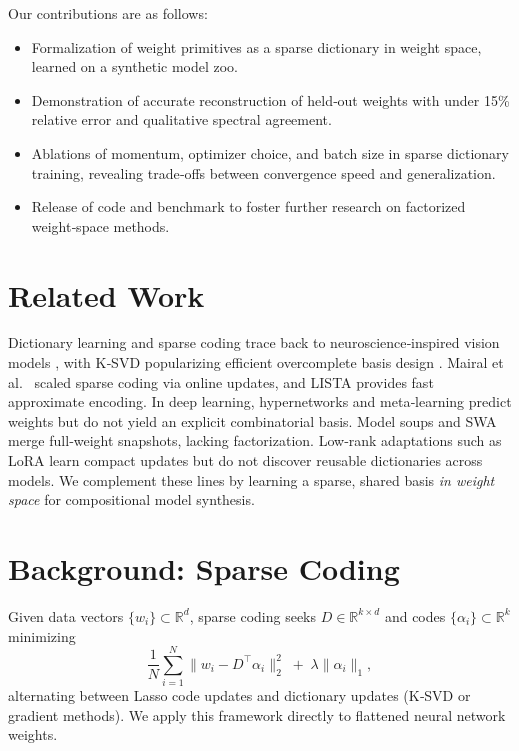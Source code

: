 \documentclass{article}
\begin{document}
Our contributions are as follows:
\begin{itemize}
  \item Formalization of weight primitives as a sparse dictionary in weight space, learned on a synthetic model zoo.
  \item Demonstration of accurate reconstruction of held‐out weights with under 15\% relative error and qualitative spectral agreement.
  \item Ablations of momentum, optimizer choice, and batch size in sparse dictionary training, revealing trade‐offs between convergence speed and generalization.
  \item Release of code and benchmark to foster further research on factorized weight‐space methods.
\end{itemize}

\section{Related Work}
Dictionary learning and sparse coding trace back to neuroscience‐inspired vision models \citep{olshausen1997sparsecw}, with K‐SVD popularizing efficient overcomplete basis design \citep{aharon2006rmka}.  Mairal et al.\ \citep{mairal2009onlinelf} scaled sparse coding via online updates, and LISTA \citep{gregor2010learningfa} provides fast approximate encoding.  In deep learning, hypernetworks \citep{ha2016hypernetworks} and meta‐learning \citep{finn2017modelagnosticmf} predict weights but do not yield an explicit combinatorial basis.  Model soups \citep{wortsman2022modelsa} and SWA \citep{izmailov2018averagingwl} merge full‐weight snapshots, lacking factorization.  Low‐rank adaptations such as LoRA \citep{hu2021lorala} learn compact updates but do not discover reusable dictionaries across models.  We complement these lines by learning a sparse, shared basis \emph{in weight space} for compositional model synthesis.

\section{Background: Sparse Coding}
Given data vectors $\{w_i\}\subset\mathbb R^d$, sparse coding seeks $D\in\mathbb R^{k\times d}$ and codes $\{\alpha_i\}\subset\mathbb R^k$ minimizing
\[
  \frac1N\sum_{i=1}^N\|w_i - D^\top\alpha_i\|_2^2 \;+\;\lambda\|\alpha_i\|_1,
\]
alternating between Lasso code updates and dictionary updates (K‐SVD \citep{aharon2006rmka} or gradient methods).  We apply this framework directly to flattened neural network weights.
\end{document}
